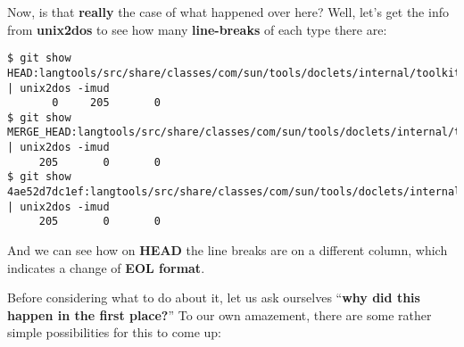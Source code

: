 Now, is that {\bf really} the case of what happened over here? Well, let's get the info from {\bf unix2dos} to see how many
{\bf line-breaks} of each type there are:

\begin{lstlisting}[style=console_style,
	basicstyle=\small,
	caption={\bf example 17} - file types]
$ git show HEAD:langtools/src/share/classes/com/sun/tools/doclets/internal/toolkit/resources/doclet.xml | unix2dos -imud
       0     205       0
$ git show MERGE_HEAD:langtools/src/share/classes/com/sun/tools/doclets/internal/toolkit/resources/doclet.xml | unix2dos -imud
     205       0       0
$ git show 4ae52d7dc1ef:langtools/src/share/classes/com/sun/tools/doclets/internal/toolkit/resources/doclet.xml | unix2dos -imud
     205       0       0
\end{lstlisting}

And we can see how on {\bf HEAD} the line breaks are on a different column, which indicates a change of {\bf EOL format}.

Before considering what to do about it, let us ask ourselves ``{\bf why did this happen in the first place?}'' To our own amazement,
there are some rather simple possibilities for this to come up:

